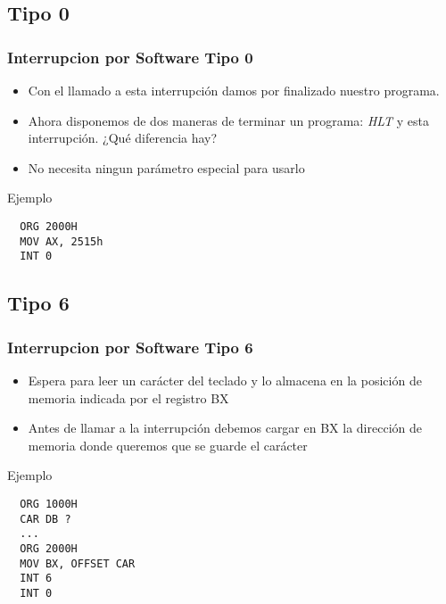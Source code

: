\documentclass{beamer}
\begin{document}
\subsection{Tipo 0}
\begin{frame}[fragile]
\frametitle{Interrupcion por Software Tipo 0}
\begin{itemize}
 \item Con el llamado a esta interrupción damos por finalizado nuestro programa.
 \item Ahora disponemos de dos maneras de terminar un programa: \emph{HLT} y esta interrupción. ¿Qué diferencia hay?
 \item No necesita ningun parámetro especial para usarlo
\end{itemize}

\begin{block}{Ejemplo}

\begin{verbatim}
  ORG 2000H
  MOV AX, 2515h
  INT 0
\end{verbatim}

\end{block}

\end{frame}

\subsection{Tipo 6}
\begin{frame}[fragile]
\frametitle{Interrupcion por Software Tipo 6}
\begin{itemize}
 \item Espera para leer un carácter del teclado y lo almacena en la posición de memoria indicada por el registro BX
 \item Antes de llamar a la interrupción debemos cargar en BX la dirección de memoria donde queremos que se guarde el carácter
\end{itemize}

\begin{block}{Ejemplo}

\begin{verbatim}
  ORG 1000H
  CAR DB ?
  ...
  ORG 2000H
  MOV BX, OFFSET CAR
  INT 6
  INT 0

\end{verbatim}

\end{block}

\end{frame}
\end{document}
